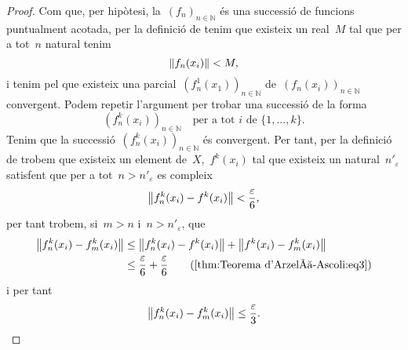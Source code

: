 \documentclass[../../main.tex]{subfiles}
\begin{document}
\begin{proof}
        Com que, per hipòtesi, la~\((f_{n})_{n\in\mathbb{N}}\) és una successió de funcions puntualment acotada, per la definició de  tenim que existeix un real~\(M\) tal que per a tot~\(n\) natural tenim
        \[
            \norm{f_{n}(x_{i})}<M,
        \]
        i tenim pel  que existeix una parcial~\((f_{n}^{1}(x_{1}))_{n\in\mathbb{N}}\) de~\((f_{n}(x_{i}))_{n\in\mathbb{N}}\) convergent.
        Podem repetir l'argument per trobar una successió de la forma
        \[
            (f^{k}_{n}(x_{i}))_{n\in\mathbb{N}}\quad\text{per a tot }i\text{ de }\{1,\dots,k\}.
        \]
        Tenim que la successió~\((f^{k}_{n}(x_{i}))_{n\in\mathbb{N}}\) és convergent.
        Per tant, per la definició de  trobem que existeix un element de~\(X\),~\(f^{k}(x_{i})\) tal que existeix un natural~\(n'_{\varepsilon}\) satisfent que per a tot~\(n>n'_{\varepsilon}\) es compleix
        \begin{equation}
            \label{thm:Teorema d'Arzelà-Ascoli:eq3}
            \norm{f^{k}_{n}(x_{i})-f^{k}(x_{i})}<\frac{\varepsilon}{6},
        \end{equation}
        per tant trobem, si~\(m>n\) i~\(n>n'_{\varepsilon}\), que
        \begin{align*}
            \norm{f^{k}_{n}(x_{i})-f^{k}_{m}(x_{i})}&\leq\norm{f^{k}_{n}(x_{i})-f^{k}(x_{i})}+\norm{f^{k}(x_{i})-f^{k}_{m}(x_{i})} \\
            &\leq\frac{\varepsilon}{6}+\frac{\varepsilon}{6} \tag{\ref{thm:Teorema d'Arzelà-Ascoli:eq3}}
        \end{align*}
        i per tant
        \begin{equation}
            \label{thm:Teorema d'Arzelà-Ascoli:eq4}
            \norm{f^{k}_{n}(x_{i})-f^{k}_{m}(x_{i})}\leq\frac{\varepsilon}{3}.
        \end{equation}


\end{proof}
\end{document}
